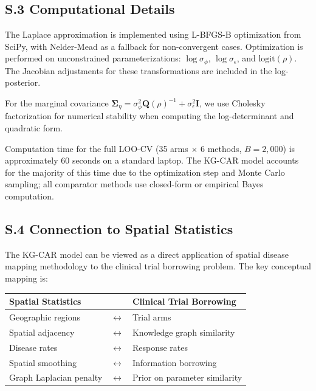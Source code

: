 \documentclass[12pt]{article}
\newcommand{\bI}{\mathbf{I}}
\newcommand{\bQ}{\mathbf{Q}}
\begin{document}
{\subsection*{S.3 Computational Details}

The Laplace approximation is implemented using L-BFGS-B optimization from SciPy, with Nelder-Mead as a fallback for non-convergent cases. Optimization is performed on unconstrained parameterizations: $\log \sigma_\phi$, $\log \sigma_\epsilon$, and $\text{logit}(\rho)$. The Jacobian adjustments for these transformations are included in the log-posterior.

For the marginal covariance $\boldsymbol{\Sigma}_\eta = \sigma_\phi^2 \bQ(\rho)^{-1} + \sigma_\epsilon^2 \bI$, we use Cholesky factorization for numerical stability when computing the log-determinant and quadratic form.

Computation time for the full LOO-CV (35 arms $\times$ 6 methods, $B = 2{,}000$) is approximately 60 seconds on a standard laptop. The KG-CAR model accounts for the majority of this time due to the optimization step and Monte Carlo sampling; all comparator methods use closed-form or empirical Bayes computation.

\subsection*{S.4 Connection to Spatial Statistics}

The KG-CAR model can be viewed as a direct application of spatial disease mapping methodology \citep{besag1991bayesian, leroux2000estimation, rue2005gaussian} to the clinical trial borrowing problem. The key conceptual mapping is:

\begin{center}
\begin{tabular}{lll}
\toprule
Spatial Statistics & & Clinical Trial Borrowing \\
\midrule
Geographic regions & $\longleftrightarrow$ & Trial arms \\
Spatial adjacency & $\longleftrightarrow$ & Knowledge graph similarity \\
Disease rates & $\longleftrightarrow$ & Response rates \\
Spatial smoothing & $\longleftrightarrow$ & Information borrowing \\
Graph Laplacian penalty & $\longleftrightarrow$ & Prior on parameter similarity \\
\bottomrule
\end{tabular}
\end{center}

}
\end{document}
